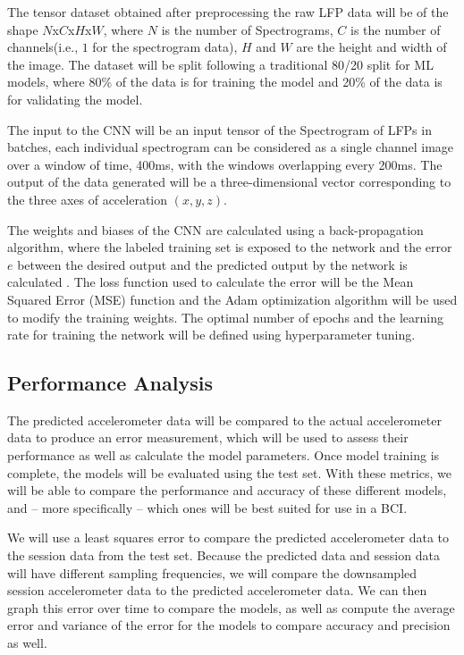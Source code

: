 \documentclass[12pt]{article}
\begin{document}
The tensor dataset obtained after preprocessing the raw LFP data will be of the shape $N$x$C$x$H$x$W$, where $N$ is the number of Spectrograms, $C$ is the number of channels(i.e., $1$ for the spectrogram data), $H$ and $W$ are the height and width of the image. The dataset will be split following a traditional 80/20 split for ML models, where 80\% of the data is for training the model and 20\% of the data is for validating the model.

The input to the CNN will be an input tensor of the Spectrogram of LFPs in batches, each individual spectrogram can be considered as a single channel image over a window of time, 400ms, with the windows overlapping every 200ms. The output of the data generated will be a three-dimensional vector corresponding to the three axes of acceleration $(x, y, z)$.

The weights and biases of the CNN are calculated using a back-propagation algorithm, where the labeled training set is exposed to the network and the error $e$ between the desired output and the predicted output by the network is calculated \cite{hecht1992}. The loss function used to calculate the error will be the Mean Squared Error (MSE) function and the Adam optimization algorithm will be used to modify the training weights. The optimal number of epochs and the learning rate for training the network will be defined using hyperparameter tuning.

\subsection{Performance Analysis}

The predicted accelerometer data will be compared to the actual accelerometer data to produce an error measurement, which will be used to assess their performance as well as calculate the model parameters. Once model training is complete, the models will be evaluated using the test set. With these metrics, we will be able to compare the performance and accuracy of these different models, and -- more specifically -- which ones will be best suited for use in a BCI.

We will use a least squares error to compare the predicted accelerometer data to the session data from the test set. Because the predicted data and session data will have different sampling frequencies, we will compare the downsampled session accelerometer data to the predicted accelerometer data. We can then graph this error over time to compare the models, as well as compute the average error and variance of the error for the models to compare accuracy and precision as well.
\end{document}
